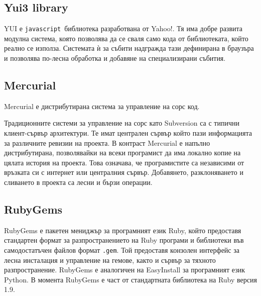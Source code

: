 \documentclass[a4paper]{article}
\def\js{\texttt{javascript}}
\begin{document}

  \subsection{Yui3 library}
  YUI \cite{yui} е \js\ библиотека разработвана от Yahoo!. Тя има добре развита модулна система, която позволява да се сваля само кода от библиотеката, който реално се използа. Системата ѝ за събити надгражда тази дефинирана в браузъра и позволява по-лесна обработка и добавяне на специализирани събития.

  \subsection{Mercurial}
  Mercurial \cite{mercurial} е дистрибутирана система за управление на сорс код.

  Традиционните системи за управление на сорс като Subversion са с типични клиент-сървър архитектури. Те имат централен сървър който пази информацията за различните ревизии на проекта. В контраст Mercurial е напълно дистрибутирана, позволявайки на всеки програмист да има локално копие на цялата история на проекта. Това означава, че програмистите са независими от връзката си с интернет или централния сървър. Добавянето, разклоняването и сливането в проекта са лесни и бързи операции.

  \subsection{RubyGems}
  RubyGems \cite{rubygems} е пакетен мениджър за програмният език Ruby, който предоставя стандартен формат за разпространението на Ruby програми и библиотеки във самодостатъчен файлов формат \texttt{.gem}. Той предоставя конзолен интерфейс за лесна инсталация и управление на гемове, както и сървър за тяхното разпространение. RubyGems е аналогичен на EasyInstall за програмният език Python. В момента RubyGems е част от стандартната библиотека на Ruby версия 1.9.
\end{document}

